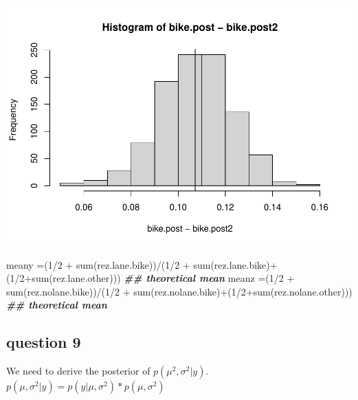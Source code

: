 \documentclass[
]{book}
\newenvironment{Shaded}{\begin{snugshade}}{\end{snugshade}}
\newcommand{\DecValTok}[1]{\textcolor[rgb]{0.00,0.00,0.81}{#1}}
\newcommand{\DocumentationTok}[1]{\textcolor[rgb]{0.56,0.35,0.01}{\textbf{\textit{#1}}}}
\newcommand{\FunctionTok}[1]{\textcolor[rgb]{0.00,0.00,0.00}{#1}}
\newcommand{\NormalTok}[1]{#1}
\newcommand{\OtherTok}[1]{\textcolor[rgb]{0.56,0.35,0.01}{#1}}
\newcommand{\SpecialCharTok}[1]{\textcolor[rgb]{0.00,0.00,0.00}{#1}}
\theoremstyle{definition}
\theoremstyle{definition}
\theoremstyle{definition}
\theoremstyle{definition}
\theoremstyle{remark}
\begin{document}
\includegraphics{_main_files/figure-latex/unnamed-chunk-48-1.pdf}

\begin{Shaded}
\begin{Highlighting}[]
\NormalTok{ meany }\OtherTok{=}\NormalTok{(}\DecValTok{1}\SpecialCharTok{/}\DecValTok{2} \SpecialCharTok{+} \FunctionTok{sum}\NormalTok{(rez.lane.bike))}\SpecialCharTok{/}\NormalTok{(}\DecValTok{1}\SpecialCharTok{/}\DecValTok{2} \SpecialCharTok{+} \FunctionTok{sum}\NormalTok{(rez.lane.bike)}\SpecialCharTok{+}\NormalTok{(}\DecValTok{1}\SpecialCharTok{/}\DecValTok{2}\SpecialCharTok{+}\FunctionTok{sum}\NormalTok{(rez.lane.other))) }\DocumentationTok{\#\# theoretical mean}
\NormalTok{  meanz }\OtherTok{=}\NormalTok{(}\DecValTok{1}\SpecialCharTok{/}\DecValTok{2} \SpecialCharTok{+} \FunctionTok{sum}\NormalTok{(rez.nolane.bike))}\SpecialCharTok{/}\NormalTok{(}\DecValTok{1}\SpecialCharTok{/}\DecValTok{2} \SpecialCharTok{+} \FunctionTok{sum}\NormalTok{(rez.nolane.bike)}\SpecialCharTok{+}\NormalTok{(}\DecValTok{1}\SpecialCharTok{/}\DecValTok{2}\SpecialCharTok{+}\FunctionTok{sum}\NormalTok{(rez.nolane.other))) }\DocumentationTok{\#\# theoretical mean}
\end{Highlighting}
\end{Shaded}

\hypertarget{question-9}{%
\subsection*{question 9}\label{question-9}}

We need to derive the posterior of \(p(\mu^2, \sigma^2 | y)\). \(p(\mu,\sigma^2 | y) = p(y|\mu,\sigma^2)*p(\mu , \sigma^2)\)
\end{document}
